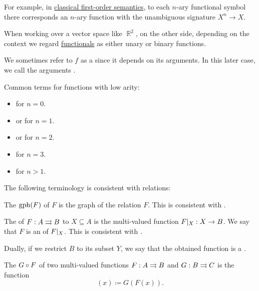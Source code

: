 \begin{definition}
\begin{thmenum}[series=def:multi_valued_function]
    For example, in \hyperref[def:first_order_semantics]{classical first-order semantics}, to each \( n \)-ary functional symbol there corresponds an \( n \)-ary function with the unambiguous signature \( X^n \to X \).

    When working over a vector space like \( \BbbR^2 \), on the other side, depending on the context we regard \hyperref[rem:functional]{functionals} as either unary or binary functions.

    We sometimes refer to \( f \) as a  since it depends on its arguments. In this later case, we call the arguments .

    Common terms for functions with low arity:
    \begin{itemize}
      \item {} for \( n = 0 \).
      \item {} or  for \( n = 1 \).
      \item {} or  for \( n = 2 \).
      \item {} for \( n = 3 \).
      \item {} for \( n > 1 \).
    \end{itemize}
  \end{thmenum}

  The following terminology is consistent with relations:
  \begin{thmenum}[resume=def:multi_valued_function]
     The  \( \operatorname{gph}(F) \) of \( F \) is the graph of the relation \( F \). This is consistent with .

     The  of \( F: A \rightrightarrows B \) to \( X \subseteq A \) is the multi-valued function \( F\vert_{X}: X \rightarrow B \). We say that \( F \) is an  of \( F\vert_{X} \). This is consistent with .

     Dually, if we restrict \( B \) to its subset \( Y \), we say that the obtained function is a .

     The  \( G \bincirc F \) of two multi-valued functions \( F: A \rightrightarrows B \) and \( G: B \rightrightarrows C \) is the function
    \begin{equation*}
      [G \bincirc F](x) \coloneqq G(F(x)).
    \end{equation*}


\end{thmenum}
\end{definition}
